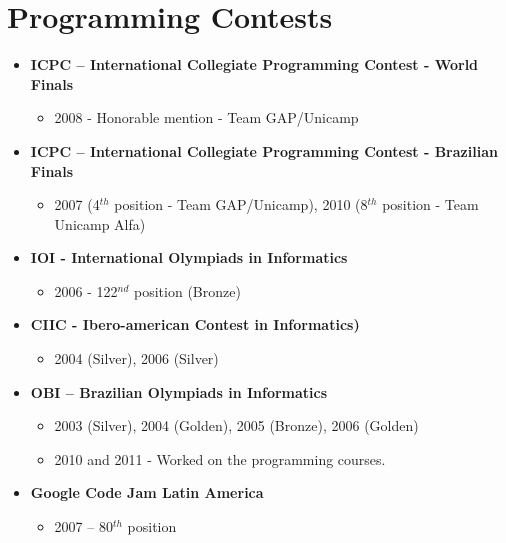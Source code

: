 \documentclass[a4paper,10pt]{article}
\begin{document}
  \section{Programming Contests}
    \begin{itemize}
      \item 
        \textbf{ICPC – International Collegiate Programming Contest - World Finals}
        \begin{itemize}
          \item 2008 - Honorable mention - Team GAP/Unicamp
        \end{itemize}
      \item 
        \textbf{ICPC – International Collegiate Programming Contest - Brazilian Finals}
        \begin{itemize}
          \item 2007 (4$^{th}$ position - Team GAP/Unicamp), 2010 (8$^{th}$ position - Team Unicamp Alfa)
        \end{itemize}
      \item 
        \textbf{IOI - International Olympiads in Informatics}
        \begin{itemize}
          \item 2006 - 122$^{nd}$ position (Bronze)
        \end{itemize}
      \item 
        \textbf{CIIC - Ibero-american Contest in Informatics)}
        \begin{itemize}
          \item 2004 (Silver), 2006 (Silver)
        \end{itemize}
      \item
        \textbf{OBI – Brazilian Olympiads in Informatics}
        \begin{itemize}
          \item 2003 (Silver), 2004 (Golden), 2005 (Bronze), 2006 (Golden)
          \item 2010 and 2011 - Worked on the programming courses.
        \end{itemize}
      \item 
        \textbf{Google Code Jam Latin America}
        \begin{itemize}
          \item 2007 – 80$^{th}$ position
        \end{itemize}
    \end{itemize}
\end{document}
